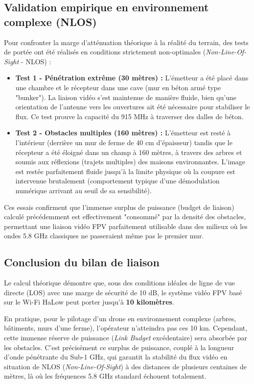 \subsection{Validation empirique en environnement complexe (NLOS)}
Pour confronter la marge d'atténuation théorique à la réalité du terrain, des tests de portée ont été réalisés en 
conditions strictement non-optimales (\textit{Non-Line-Of-Sight} - NLOS) :
\begin{itemize}
    \item \textbf{Test 1 - Pénétration extrême (30 mètres) :} L'émetteur a été placé dans une chambre et le récepteur 
    dans une cave (mur en béton armé type "bunker"). La liaison vidéo s'est maintenue de manière fluide, bien qu'une 
    orientation de l'antenne vers les ouvertures ait été nécessaire pour stabiliser le flux. Ce test prouve la capacité 
    du 915 MHz à traverser des dalles de béton.
    \item \textbf{Test 2 - Obstacles multiples (160 mètres) :} L'émetteur est resté à l'intérieur (derrière un mur de ferme 
    de 40 cm d'épaisseur) tandis que le récepteur a été éloigné dans un champ à 160 mètres, à travers des arbres et soumis 
    aux réflexions (trajets multiples) des maisons environnantes. L'image est restée parfaitement fluide jusqu'à la limite 
    physique où la coupure est intervenue brutalement (comportement typique d'une démodulation numérique arrivant au seuil 
    de sa sensibilité).
\end{itemize}
Ces essais confirment que l'immense surplus de puissance (budget de liaison) calculé précédemment est effectivement "consommé" 
par la densité des obstacles, permettant une liaison vidéo FPV parfaitement utilisable dans des milieux où les ondes 5.8 GHz 
classiques ne passeraient même pas le premier mur.

\subsection{Conclusion du bilan de liaison}
Le calcul théorique démontre que, sous des conditions idéales de ligne de vue directe (LOS) avec une marge de 
sécurité de 10 dB, le système vidéo FPV basé sur le Wi-Fi HaLow peut porter jusqu'à \textbf{10 kilomètres}.

En pratique, pour le pilotage d'un drone en environnement complexe (arbres, bâtiments, murs d'une ferme), 
l'opérateur n'atteindra pas ces 10 km. Cependant, cette immense réserve de puissance (\textit{Link Budget} 
excédentaire) sera absorbée par les obstacles. C'est précisément ce surplus de puissance, couplé à la longueur 
d'onde pénétrante du Sub-1 GHz, qui garantit la stabilité du flux vidéo en situation de NLOS 
(\textit{Non-Line-Of-Sight}) à des distances de plusieurs centaines de mètres, là où les fréquences 
5.8 GHz standard échouent totalement.